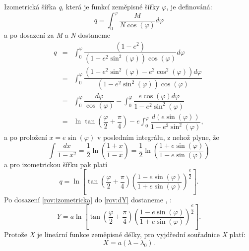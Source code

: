 Izometrická šířka \textit{q}, která je funkcí zeměpisné šířky $\varphi$, je definováná:
\begin{equation}
q = \int_{0}^{\varphi}\dfrac{M}{N\cos{\left(\varphi\right)}}d\varphi
\end{equation}
a po dosazení za \textit{M} a \textit{N} dostaneme
\begin{eqnarray}
q &=& \int_{0}^{\varphi} \dfrac{\left(1-e^{2}\right)}{\left(1-e^{2}\sin^{2}{\left(\varphi\right)}\right)\cos{\left(\varphi\right)}}d\varphi \\ \nonumber
  &=&\int_{0}^{\varphi}\dfrac{\left(1-e^{2}\sin^{2}{\left(\varphi\right)}-e^{2}\cos^{2}{\left(\varphi\right)}\right)d\varphi}{\left(1-e^{2}\sin^{2}{\left(\varphi\right)}\right)\cos{\left(\varphi\right)}} \\ \nonumber
  &=& \int_{0}^{\varphi}\dfrac{d\varphi}{\cos{\left(\varphi\right)}} - \int_{0}^{\varphi}\dfrac{e\cos{\left(\varphi\right)}d\varphi}{1-e^{2}\sin^{2}{\left(\varphi\right)}} \\ \nonumber
  &=& \ln\tan{\left(\dfrac{\varphi}{2} + \dfrac{\pi}{4}\right)} - e\int_{0}^{\varphi}\dfrac{d\left(e\sin{\left(\varphi\right)}\right)}{1-e^{2}\sin^{2}{\left(\varphi\right)}},
\end{eqnarray}
a po proložení $x = e\sin{\left(\varphi\right)}$ v posledním integrálu, z nehož plyne, že 
\begin{equation}
\int \dfrac{dx}{1-x^{2}} = \dfrac{1}{2}\ln{\left(\dfrac{1+x}{1-x}\right)} = \dfrac{1}{2}\ln{\left(\dfrac{1+e\sin{\left(\varphi\right)}}{1-e\sin{\left(\varphi\right)}}\right)}
\end{equation}
a pro izometrickou šířku pak platí
\begin{equation}
q = \ln{\left[\tan{\left(\dfrac{\varphi}{2}+\dfrac{\pi}{4}\right)}\left( \dfrac{1-e\sin{\left(\varphi\right)}}{1+e\sin{\left(\varphi\right)}} \right)^{\dfrac{e}{2}}\right]}.
\label{rov:izometricka}
\end{equation}
Po dosazení \ref{rov:izometricka} do \ref{rov:dY} dostaneme \cite{Buchar2002}, \cite{Snyder1987}:
\begin{equation}
Y = a\ln{\left[\tan{\left(\dfrac{\varphi}{2}+\dfrac{\pi}{4}\right)}\left( \dfrac{1-e\sin{\left(\varphi\right)}}{1+e\sin{\left(\varphi\right)}} \right)^{\dfrac{e}{2}}\right]}.
\label{rov:utmY}
\end{equation}
Protože \textit{X} je lineární funkce zeměpisné délky, pro vyjdřední souřadnice \textit{X} platí:
\begin{equation}
X = a\left(\lambda-\lambda_{0}\right).
\end{equation}

